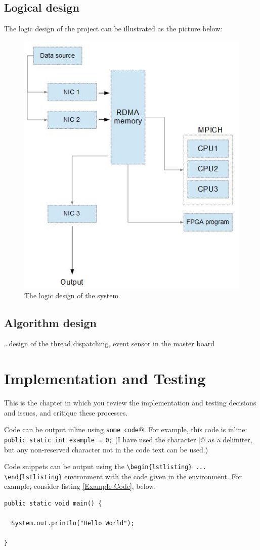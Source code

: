 \documentclass[11pt,openright,a4paper]{report}
\begin{document}
\section{Logical design}
The logic design of the project can be illustrated as the picture below:
\begin{figure}[H]
	\centering
	\includegraphics[width=0.5\linewidth]{picture/LogicDesign}
	\caption{The logic design of the system}
	\label{fig:LogicDesign}
\end{figure}
\section{Algorithm design}
\dots design of the thread dispatching, event sensor in the master board
\chapter{Implementation and Testing}
This is the chapter in which you review the implementation and testing
decisions and issues, and critique these processes.

Code can be output inline using \verb@\lstinline|some code|@.  For example,
this code is inline: \lstinline|public static int example = 0;|  (I have
used the character \verb@|@ as a delimiter, but any non-reserved character
not in the code text can be used.)

Code snippets can be output using the \verb|\begin{lstlisting} ... \end{lstlisting}|
environment with the code given in the environment.  For
example, consider listing \ref{Example-Code}, below.

\begin{lstlisting}[breaklines,breakatwhitespace,caption={Example code},label=Example-Code]
public static void main() {

  System.out.println("Hello World");

}
\end{lstlisting}
\end{document}
